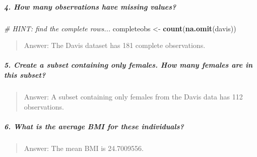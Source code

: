 \documentclass[]{elsarticle} %
\newenvironment{Shaded}{\begin{snugshade}}{\end{snugshade}}
\newcommand{\KeywordTok}[1]{\textcolor[rgb]{0.13,0.29,0.53}{\textbf{{#1}}}}
\newcommand{\DataTypeTok}[1]{\textcolor[rgb]{0.13,0.29,0.53}{{#1}}}
\newcommand{\DecValTok}[1]{\textcolor[rgb]{0.00,0.00,0.81}{{#1}}}
\newcommand{\FloatTok}[1]{\textcolor[rgb]{0.00,0.00,0.81}{{#1}}}
\newcommand{\StringTok}[1]{\textcolor[rgb]{0.31,0.60,0.02}{{#1}}}
\newcommand{\CommentTok}[1]{\textcolor[rgb]{0.56,0.35,0.01}{\textit{{#1}}}}
\newcommand{\NormalTok}[1]{{#1}}
\begin{document}
\subparagraph{4. How many observations have missing
values?}\label{how-many-observations-have-missing-values}

\begin{Shaded}
\begin{Highlighting}[]
\CommentTok{# HINT: find the complete rows...}
\NormalTok{completeobs <-}\StringTok{ }\KeywordTok{count}\NormalTok{(}\KeywordTok{na.omit}\NormalTok{(davis))}
\end{Highlighting}
\end{Shaded}

\begin{quote}
Answer: The Davis dataset has 181 complete observations.
\end{quote}

\subparagraph{5. Create a subset containing only females. How many
females are in this
subset?}\label{create-a-subset-containing-only-females.-how-many-females-are-in-this-subset}

\begin{Shaded}
\end{Shaded}

\begin{quote}
Answer: A subset containing only females from the Davis data has 112
observations.
\end{quote}

\subparagraph{6. What is the average BMI for these
individuals?}\label{what-is-the-average-bmi-for-these-individuals}

\begin{Shaded}
\end{Shaded}

\begin{quote}
Answer: The mean BMI is 24.7009556.
\end{quote}
\end{document}
